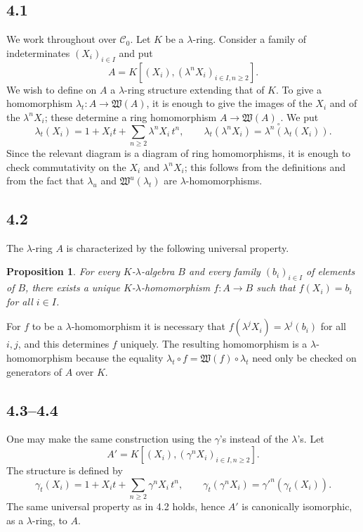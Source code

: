 \documentclass[13pt]{extarticle}
\newtheorem*{proposition}{Proposition}
\begin{document}
\subsection*{4.1}
We work throughout over $\mathcal C_0$. Let $K$ be a $\lambda$-ring. Consider a family of indeterminates $(X_i)_{i\in I}$ and put
\[
A=K[(X_i), (\lambda^nX_i)_{i\in I,n\geq 2}].
\]
We wish to define on $A$ a $\lambda$-ring structure extending that of $K$. To give a homomorphism $\lambda_t:A\to\mathfrak W(A)$, it is enough to give the images of the $X_i$ and of the $\lambda^nX_i$; these determine a ring homomorphism $A\to\mathfrak W(A)_\circ$. We put
\begin{equation}\label{eq:4.1.1}
\lambda_t(X_i)=1+X_it+\sum_{n\geq 2}\lambda^nX_i\,t^n,
\qquad
\lambda_t(\lambda^nX_i)=\lambda^n(\lambda_t(X_i)).
\end{equation}
Since the relevant diagram is a diagram of ring homomorphisms, it is enough to check commutativity on the $X_i$ and $\lambda^nX_i$; this follows from the definitions and from the fact that $\lambda_u$ and $\mathfrak W^u(\lambda_t)$ are $\lambda$-homomorphisms.

\subsection*{4.2}
The $\lambda$-ring $A$ is characterized by the following universal property.

\begin{proposition}
For every $K$-$\lambda$-algebra $B$ and every family $(b_i)_{i\in I}$ of elements of $B$, there exists a unique $K$-$\lambda$-homomorphism $f:A\to B$ such that $f(X_i)=b_i$ for all $i\in I$.
\end{proposition}

For $f$ to be a $\lambda$-homomorphism it is necessary that $f(\lambda^jX_i)=\lambda^j(b_i)$ for all $i,j$, and this determines $f$ uniquely. The resulting homomorphism is a $\lambda$-homomorphism because the equality $\lambda_t\circ f=\mathfrak W(f)\circ\lambda_t$ need only be checked on generators of $A$ over $K$.

\subsection*{4.3--4.4}
One may make the same construction using the $\gamma$'s instead of the $\lambda$'s. Let
\[
A'=K[(X_i),(\gamma^nX_i)_{i\in I,n\geq 2}].
\]
The structure is defined by
\begin{equation}\label{eq:4.3.1}
\gamma_t(X_i)=1+X_it+\sum_{n\geq 2}\gamma^nX_i\,t^n,
\qquad
\gamma_t(\gamma^nX_i)=\gamma'^n(\gamma_t(X_i)).
\end{equation}
The same universal property as in 4.2 holds, hence $A'$ is canonically isomorphic, as a $\lambda$-ring, to $A$.
\end{document}
